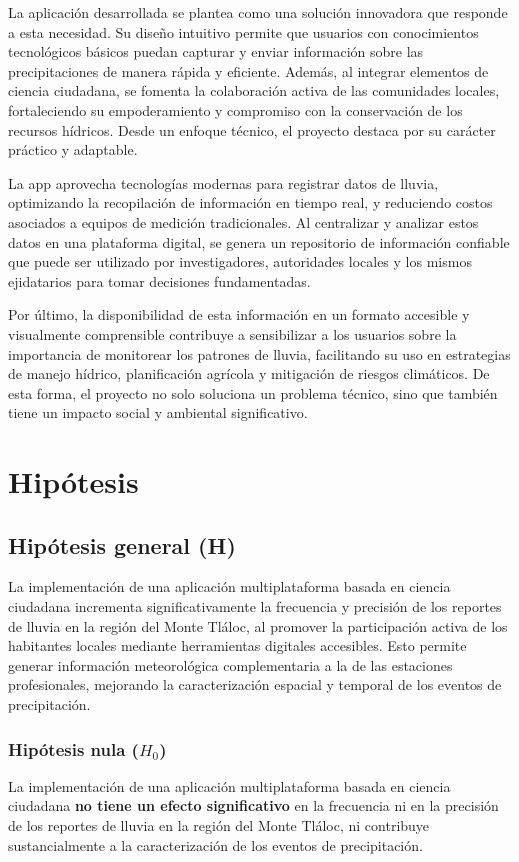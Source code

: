 La aplicación desarrollada se plantea como una solución innovadora que responde a esta necesidad. Su diseño intuitivo permite que usuarios con conocimientos tecnológicos básicos puedan capturar y enviar información sobre las precipitaciones de manera rápida y eficiente. Además, al integrar elementos de ciencia ciudadana, se fomenta la colaboración activa de las comunidades locales, fortaleciendo su empoderamiento y compromiso con la conservación de los recursos hídricos. Desde un enfoque técnico, el proyecto destaca por su carácter práctico y adaptable.

La app aprovecha tecnologías modernas para registrar datos de lluvia, optimizando la recopilación de información en tiempo real, y reduciendo costos asociados a equipos de medición tradicionales. Al centralizar y analizar estos datos en una plataforma digital, se genera un repositorio de información confiable que puede ser utilizado por investigadores, autoridades locales y los mismos ejidatarios para tomar
decisiones fundamentadas.

Por último, la disponibilidad de esta información en un formato accesible y visualmente comprensible contribuye a sensibilizar a los usuarios sobre la importancia de monitorear los patrones de lluvia, facilitando su uso en estrategias de manejo hídrico, planificación agrícola y mitigación de riesgos climáticos. De esta forma, el proyecto no solo soluciona un problema técnico, sino que también tiene un
impacto social y ambiental significativo.



\section{Hipótesis}
\subsection{Hipótesis general (H)}

La implementación de una aplicación multiplataforma basada en ciencia ciudadana incrementa significativamente la frecuencia y precisión de los reportes de lluvia en la región del Monte Tláloc, al promover la participación activa de los habitantes locales mediante herramientas digitales accesibles. Esto permite generar información meteorológica complementaria a la de las estaciones profesionales, mejorando la caracterización espacial y temporal de los eventos de precipitación.


\subsubsection{Hipótesis nula ($H_0$)}
La implementación de una aplicación multiplataforma basada en ciencia ciudadana \textbf{no tiene un efecto significativo} en la frecuencia ni en la precisión de los reportes de lluvia en la región del Monte Tláloc, ni contribuye sustancialmente a la caracterización de los eventos de precipitación.

